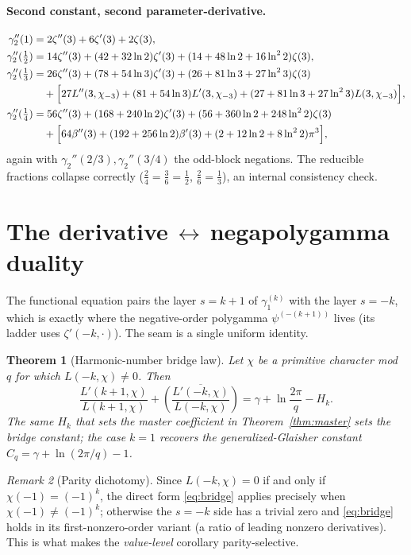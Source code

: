 \documentclass[11pt]{article}
\newtheorem{theorem}{Theorem}[section]
\theoremstyle{remark}
\newtheorem{remark}[theorem]{Remark}
\newcommand{\h}[1]{H_{#1}}
\newcommand{\chim}[1]{\chi_{-#1}}
\begin{document}
\paragraph{Second constant, second parameter-derivative.}
\begin{align*}
\gamma_2''(1)   &= 2\zeta''(3)+6\zeta'(3)+2\zeta(3),\\
\gamma_2''(\tfrac12) &= 14\zeta''(3)+(42+32\ln2)\zeta'(3)+(14+48\ln2+16\ln^2 2)\zeta(3),\\
\gamma_2''(\tfrac13) &= 26\zeta''(3)+(78+54\ln3)\zeta'(3)+(26+81\ln3+27\ln^2 3)\zeta(3)\\
 &\quad +\Bigl[27L''(3,\chim3)+(81+54\ln3)L'(3,\chim3)+(27+81\ln3+27\ln^2 3)L(3,\chim3)\Bigr],\\
\gamma_2''(\tfrac14) &= 56\zeta''(3)+(168+240\ln2)\zeta'(3)+(56+360\ln2+248\ln^2 2)\zeta(3)\\
 &\quad +\Bigl[64\beta''(3)+(192+256\ln2)\beta'(3)+(2+12\ln2+8\ln^2 2)\pi^3\Bigr],
\end{align*}
again with $\gamma_2''(2/3),\gamma_2''(3/4)$ the odd-block negations. The
reducible fractions collapse correctly ($\tfrac24=\tfrac36=\tfrac12$,
$\tfrac26=\tfrac13$), an internal consistency check.

\section{The derivative\,$\leftrightarrow$\,negapolygamma duality}\label{sec:duality}

The functional equation pairs the layer $s=k+1$ of $\gamma_1^{(k)}$ with the
layer $s=-k$, which is exactly where the negative-order polygamma
$\psi^{(-(k+1))}$ lives (its ladder uses $\zeta'(-k,\cdot)$). The seam is a
single uniform identity.

\begin{theorem}[Harmonic-number bridge law]\label{thm:bridge}
Let $\chi$ be a primitive character mod $q$ for which $L(-k,\chi)\neq0$. Then
\begin{equation}\label{eq:bridge}
  \frac{L'(k{+}1,\chi)}{L(k{+}1,\chi)}
   +\overline{\left(\frac{L'(-k,\chi)}{L(-k,\chi)}\right)}
   =\gamma+\ln\frac{2\pi}{q}-\h{k}.
\end{equation}
The same $\h{k}$ that sets the master coefficient in
Theorem~\ref{thm:master} sets the bridge constant; the case $k=1$ recovers the
generalized-Glaisher constant $C_q=\gamma+\ln(2\pi/q)-1$.
\end{theorem}

\begin{remark}[Parity dichotomy]\label{rem:parity}
Since $L(-k,\chi)=0$ if and only if $\chi(-1)=(-1)^k$, the
direct form \eqref{eq:bridge} applies precisely when $\chi(-1)\neq(-1)^k$;
otherwise the $s=-k$ side has a trivial zero and \eqref{eq:bridge} holds in its
first-nonzero-order variant (a ratio of leading nonzero derivatives). This is
what makes the \emph{value-level} corollary parity-selective.
\end{remark}
\end{document}
